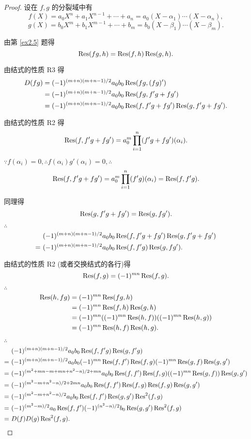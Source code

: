 \documentclass[UTF8]{ctexart}
\begin{document}
\begin{proof}
    设在 $f,g$ 的分裂域中有
    \[f(X)=a_0X^n+a_1X^{n-1}+\cdots+a_n=a_0(X-\alpha_1)\cdots(X-\alpha_n),\]
    \[g(X)=b_0X^m+b_1X^{m-1}+\cdots+b_m=b_0(X-\beta_1)\cdots(X-\beta_m).\]

    由第 \ref{ex2.5} 题得
    \[\operatorname{Res} (fg,h)=\operatorname{Res} (f,h)\operatorname{Res} (g,h).\]

    由结式的性质 R3 得
    \begin{align*}
        D(fg) & =(-1)^{(m+n)(m+n-1)/2}a_0b_0\operatorname{Res} (fg,(fg)') \\
        & =(-1)^{(m+n)(m+n-1)/2}a_0b_0\operatorname{Res} (fg,f'g+fg') \\
        & =(-1)^{(m+n)(m+n-1)/2}a_0b_0\operatorname{Res} (f,f'g+fg')\operatorname{Res} (g,f'g+fg').
    \end{align*}

    由结式的性质 R2 得
    \[\operatorname{Res} (f,f'g+fg')=a_0^m\prod\limits_{i=1}^n(f'g+fg')(\alpha_i).\]

    $\because f(\alpha_i)=0,\therefore f(\alpha_i)g'(\alpha_i)=0,\therefore$
    \[\operatorname{Res} (f,f'g+fg')=a_0^m\prod\limits_{i=1}^n(f'g)(\alpha_i)=\operatorname{Res} (f,f'g).\]

    同理得
    \[\operatorname{Res} (g,f'g+fg')=\operatorname{Res} (g,fg').\]

    $\therefore$
    \begin{align*}
        & (-1)^{(m+n)(m+n-1)/2}a_0b_0\operatorname{Res} (f,f'g+fg')\operatorname{Res} (g,f'g+fg') \\
        =\  & (-1)^{(m+n)(m+n-1)/2}a_0b_0\operatorname{Res} (f,f'g)\operatorname{Res} (g,fg').
    \end{align*}

    由结式的性质 R2 (或者交换结式的各行)得
    \[\operatorname{Res} (f,g)=(-1)^{mn}\operatorname{Res} (f,g).\]

    $\therefore$
    \begin{align*}
        \operatorname{Res} (h,fg) & =(-1)^{mn}\operatorname{Res} (fg,h) \\
        & =(-1)^{mn}\operatorname{Res} (f,h)\operatorname{Res} (g,h) \\
        & =(-1)^{mn}((-1)^{mn}\operatorname{Res} (h,f))((-1)^{mn}\operatorname{Res} (h,g)) \\
        & =(-1)^{mn}\operatorname{Res} (h,f)\operatorname{Res} (h,g).
    \end{align*}

    $\therefore$
    \begin{align*}
        & (-1)^{(m+n)(m+n-1)/2}a_0b_0\operatorname{Res} (f,f'g)\operatorname{Res} (g,f'g) \\
        =\  & (-1)^{(m+n)(m+n-1)/2}a_0b_0(-1)^{mn}\operatorname{Res} (f,f')\operatorname{Res} (f,g)(-1)^{mn}\operatorname{Res} (g,f)\operatorname{Res} (g,g') \\
        =\  & (-1)^{(m^2+mn-m+mn+n^2-n)/2+mn}a_0b_0\operatorname{Res} (f,f')\operatorname{Res} (f,g)((-1)^{mn}\operatorname{Res} (g,f))\operatorname{Res} (g,g') \\
        =\  & (-1)^{(m^2-m+n^2-n)/2+2mn}a_0b_0\operatorname{Res} (f,f')\operatorname{Res} (f,g)\operatorname{Res} (f,g)\operatorname{Res} (g,g') \\
        =\  & (-1)^{(m^2-m+n^2-n)/2}a_0b_0\operatorname{Res} (f,f')\operatorname{Res} (g,g')\operatorname{Res} ^2(f,g) \\
        =\  & (-1)^{(m^2-m)/2}a_0\operatorname{Res} (f,f')(-1)^{(n^2-n)/2}b_0\operatorname{Res} (g,g')\operatorname{Res} ^2(f,g) \\
        =\  & D(f)D(g)\operatorname{Res} ^2(f,g).\qedhere
    \end{align*}
\end{proof}
\end{document}
